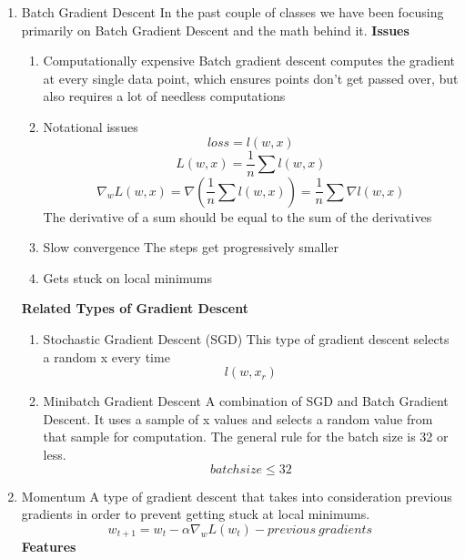 \begin{enumerate}
    \item Batch Gradient Descent
    \newline In the past couple of classes we have been focusing primarily on Batch Gradient Descent and the math behind it.
    \newline \textbf{Issues}
    \begin{enumerate}
        \item Computationally expensive
        \newline Batch gradient descent computes the gradient at every single data point, which ensures points don't get passed over, but also requires a lot of needless computations
        \item Notational issues
        \[
        loss = l(w,x)
        \]
        \[
        L(w,x) = \frac{1}{n} \sum l(w,x)
        \]
        \[
        \nabla_w L(w,x)=\nabla (\frac{1}{n} \sum l(w,x)) = \frac{1}{n} \sum \nabla l(w,x)
        \]
        The derivative of a sum should be equal to the sum of the derivatives
        \item Slow convergence
        \newline The steps get progressively smaller
        \item Gets stuck on local minimums
    \end{enumerate}
    \textbf{Related Types of Gradient Descent}
    \begin{enumerate}
        \item Stochastic Gradient Descent (SGD)
        \newline This type of gradient descent selects a random x every time
        \[
        l(w,x_r)
        \]
        \item Minibatch Gradient Descent
        \newline A combination of SGD and Batch Gradient Descent. It uses a sample of x values and selects a random value from that sample for computation.
        \newline The general rule for the batch size is 32 or less.
        \[
        batchsize \leq 32
        \]
    \end{enumerate}
    \item Momentum
    \newline A type of gradient descent that takes into consideration previous gradients in order to prevent getting stuck at local minimums.
    \[
    w_{t+1}=w_t-\alpha \nabla_w L(w_t)-previous\ gradients
    \]
    \newline \textbf{Features}

\end{enumerate}
